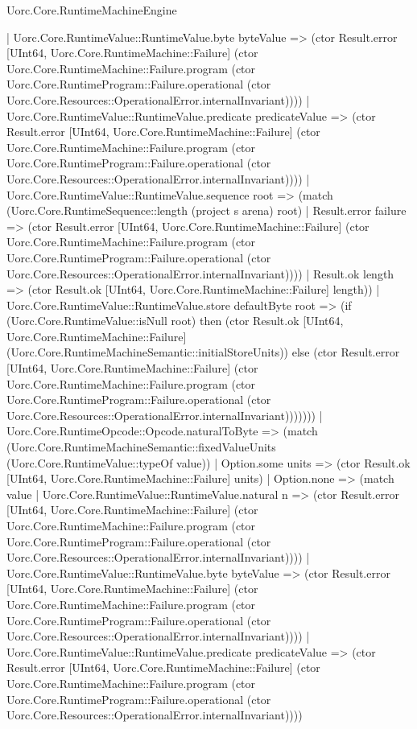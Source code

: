 \begin{lexlean}{Uorc.Core.RuntimeMachineEngine}
\begin{semanticmodule}
{              | Uorc.Core.RuntimeValue::RuntimeValue.byte byteValue => (ctor Result.error [UInt64, Uorc.Core.RuntimeMachine::Failure] (ctor Uorc.Core.RuntimeMachine::Failure.program (ctor Uorc.Core.RuntimeProgram::Failure.operational (ctor Uorc.Core.Resources::OperationalError.internalInvariant))))
              | Uorc.Core.RuntimeValue::RuntimeValue.predicate predicateValue => (ctor Result.error [UInt64, Uorc.Core.RuntimeMachine::Failure] (ctor Uorc.Core.RuntimeMachine::Failure.program (ctor Uorc.Core.RuntimeProgram::Failure.operational (ctor Uorc.Core.Resources::OperationalError.internalInvariant))))
              | Uorc.Core.RuntimeValue::RuntimeValue.sequence root => (match (Uorc.Core.RuntimeSequence::length (project s arena) root)
                | Result.error failure => (ctor Result.error [UInt64, Uorc.Core.RuntimeMachine::Failure] (ctor Uorc.Core.RuntimeMachine::Failure.program (ctor Uorc.Core.RuntimeProgram::Failure.operational (ctor Uorc.Core.Resources::OperationalError.internalInvariant))))
                | Result.ok length => (ctor Result.ok [UInt64, Uorc.Core.RuntimeMachine::Failure] length))
              | Uorc.Core.RuntimeValue::RuntimeValue.store defaultByte root => (if (Uorc.Core.RuntimeValue::isNull root) then (ctor Result.ok [UInt64, Uorc.Core.RuntimeMachine::Failure] (Uorc.Core.RuntimeMachineSemantic::initialStoreUnits)) else (ctor Result.error [UInt64, Uorc.Core.RuntimeMachine::Failure] (ctor Uorc.Core.RuntimeMachine::Failure.program (ctor Uorc.Core.RuntimeProgram::Failure.operational (ctor Uorc.Core.Resources::OperationalError.internalInvariant)))))))
          | Uorc.Core.RuntimeOpcode::Opcode.naturalToByte => (match (Uorc.Core.RuntimeMachineSemantic::fixedValueUnits (Uorc.Core.RuntimeValue::typeOf value))
            | Option.some units => (ctor Result.ok [UInt64, Uorc.Core.RuntimeMachine::Failure] units)
            | Option.none => (match value
              | Uorc.Core.RuntimeValue::RuntimeValue.natural n => (ctor Result.error [UInt64, Uorc.Core.RuntimeMachine::Failure] (ctor Uorc.Core.RuntimeMachine::Failure.program (ctor Uorc.Core.RuntimeProgram::Failure.operational (ctor Uorc.Core.Resources::OperationalError.internalInvariant))))
              | Uorc.Core.RuntimeValue::RuntimeValue.byte byteValue => (ctor Result.error [UInt64, Uorc.Core.RuntimeMachine::Failure] (ctor Uorc.Core.RuntimeMachine::Failure.program (ctor Uorc.Core.RuntimeProgram::Failure.operational (ctor Uorc.Core.Resources::OperationalError.internalInvariant))))
              | Uorc.Core.RuntimeValue::RuntimeValue.predicate predicateValue => (ctor Result.error [UInt64, Uorc.Core.RuntimeMachine::Failure] (ctor Uorc.Core.RuntimeMachine::Failure.program (ctor Uorc.Core.RuntimeProgram::Failure.operational (ctor Uorc.Core.Resources::OperationalError.internalInvariant))))
}
\end{semanticmodule}
\end{lexlean}
